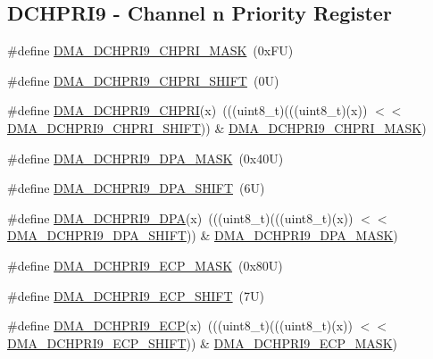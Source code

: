 \subsection*{D\+C\+H\+P\+R\+I9 -\/ Channel n Priority Register}
\begin{DoxyCompactItemize}
\item 
\#define \mbox{\hyperlink{group___d_m_a___register___masks_gac782f5e68a3eef4653396b11311fc41b}{D\+M\+A\+\_\+\+D\+C\+H\+P\+R\+I9\+\_\+\+C\+H\+P\+R\+I\+\_\+\+M\+A\+SK}}~(0x\+F\+U)
\item 
\#define \mbox{\hyperlink{group___d_m_a___register___masks_ga673fcc8804637150719453e55168fc66}{D\+M\+A\+\_\+\+D\+C\+H\+P\+R\+I9\+\_\+\+C\+H\+P\+R\+I\+\_\+\+S\+H\+I\+FT}}~(0\+U)
\item 
\#define \mbox{\hyperlink{group___d_m_a___register___masks_ga891fccde7e5bc5c0708b5f06996a7814}{D\+M\+A\+\_\+\+D\+C\+H\+P\+R\+I9\+\_\+\+C\+H\+P\+RI}}(x)~(((uint8\+\_\+t)(((uint8\+\_\+t)(x)) $<$$<$ \mbox{\hyperlink{group___d_m_a___register___masks_ga673fcc8804637150719453e55168fc66}{D\+M\+A\+\_\+\+D\+C\+H\+P\+R\+I9\+\_\+\+C\+H\+P\+R\+I\+\_\+\+S\+H\+I\+FT}})) \& \mbox{\hyperlink{group___d_m_a___register___masks_gac782f5e68a3eef4653396b11311fc41b}{D\+M\+A\+\_\+\+D\+C\+H\+P\+R\+I9\+\_\+\+C\+H\+P\+R\+I\+\_\+\+M\+A\+SK}})
\item 
\#define \mbox{\hyperlink{group___d_m_a___register___masks_gaf6b71f66ce2e3113012b094e339c2c97}{D\+M\+A\+\_\+\+D\+C\+H\+P\+R\+I9\+\_\+\+D\+P\+A\+\_\+\+M\+A\+SK}}~(0x40\+U)
\item 
\#define \mbox{\hyperlink{group___d_m_a___register___masks_ga369577ef8e1c3d9eb3756e1a37abe070}{D\+M\+A\+\_\+\+D\+C\+H\+P\+R\+I9\+\_\+\+D\+P\+A\+\_\+\+S\+H\+I\+FT}}~(6\+U)
\item 
\#define \mbox{\hyperlink{group___d_m_a___register___masks_ga431782356226307744ad4e6dc6a1ff6d}{D\+M\+A\+\_\+\+D\+C\+H\+P\+R\+I9\+\_\+\+D\+PA}}(x)~(((uint8\+\_\+t)(((uint8\+\_\+t)(x)) $<$$<$ \mbox{\hyperlink{group___d_m_a___register___masks_ga369577ef8e1c3d9eb3756e1a37abe070}{D\+M\+A\+\_\+\+D\+C\+H\+P\+R\+I9\+\_\+\+D\+P\+A\+\_\+\+S\+H\+I\+FT}})) \& \mbox{\hyperlink{group___d_m_a___register___masks_gaf6b71f66ce2e3113012b094e339c2c97}{D\+M\+A\+\_\+\+D\+C\+H\+P\+R\+I9\+\_\+\+D\+P\+A\+\_\+\+M\+A\+SK}})
\item 
\#define \mbox{\hyperlink{group___d_m_a___register___masks_gadc613e99a97309c8ca4526630226676a}{D\+M\+A\+\_\+\+D\+C\+H\+P\+R\+I9\+\_\+\+E\+C\+P\+\_\+\+M\+A\+SK}}~(0x80\+U)
\item 
\#define \mbox{\hyperlink{group___d_m_a___register___masks_gafabc45696d405cdb5aa873607867d490}{D\+M\+A\+\_\+\+D\+C\+H\+P\+R\+I9\+\_\+\+E\+C\+P\+\_\+\+S\+H\+I\+FT}}~(7\+U)
\item 
\#define \mbox{\hyperlink{group___d_m_a___register___masks_ga76452f532b845f2e58c7403813b6b13c}{D\+M\+A\+\_\+\+D\+C\+H\+P\+R\+I9\+\_\+\+E\+CP}}(x)~(((uint8\+\_\+t)(((uint8\+\_\+t)(x)) $<$$<$ \mbox{\hyperlink{group___d_m_a___register___masks_gafabc45696d405cdb5aa873607867d490}{D\+M\+A\+\_\+\+D\+C\+H\+P\+R\+I9\+\_\+\+E\+C\+P\+\_\+\+S\+H\+I\+FT}})) \& \mbox{\hyperlink{group___d_m_a___register___masks_gadc613e99a97309c8ca4526630226676a}{D\+M\+A\+\_\+\+D\+C\+H\+P\+R\+I9\+\_\+\+E\+C\+P\+\_\+\+M\+A\+SK}})
\end{DoxyCompactItemize}
